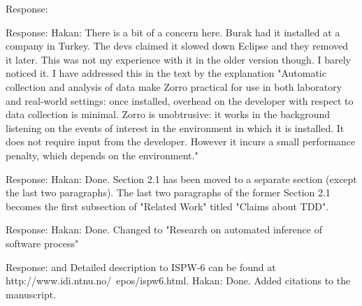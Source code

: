 \documentclass[11pt]{article}
\begin{document}

\noindent Response: \cite{csdl2-07-04}


\noindent Response: Hakan: There is a bit of a concern here. Burak had it installed at a company in Turkey. The devs claimed it slowed down Eclipse and they removed it later. This was not my experience with it in the older version though. I barely noticed it. I have addressed this in the text by the explanation "Automatic collection
and analysis of data make Zorro practical for use in both laboratory and
real-world settings: once installed, overhead on the developer
with respect to data collection is minimal. Zorro is unobtrusive:  
it works in the background listening on the events of interest in the environment 
in which it is installed. It does not require input from the developer. 
However it incurs a small performance penalty, which depends on the environment." 



\noindent Response: Hakan: Done. Section 2.1 has been moved to a separate section (except the last two paragraphs). The last two paragraphs of the former Section 2.1 becomes the first subsection of "Related Work" titled "Claims about TDD".



\noindent Response: Hakan: Done. Changed to "Research on automated inference of software process"


\noindent Response: \cite{ispw6} and \cite{Hackystat:06,csdl2-04-11,csdl2-04-22,csdl2-03-12} Detailed description to ISPW-6 can be found at http://www.idi.ntnu.no/~epos/ispw6.html. Hakan: Done. Added citations to the manuscript. 
\end{document}
